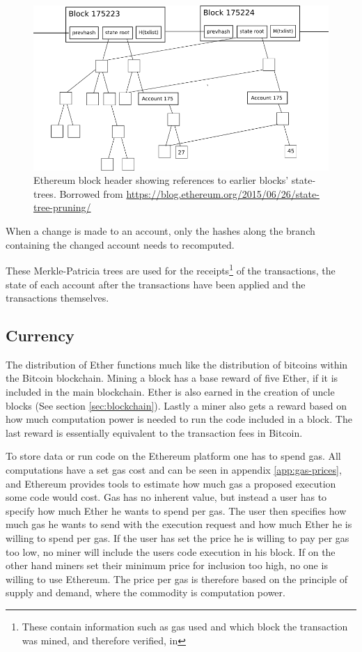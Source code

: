 \documentclass{article}
\begin{document}
			\begin{figure}[!ht]
				\centering
				\includegraphics[scale=0.4]{figures/merkle-backref.png}
			 	\caption[Ethereum block header showing references to earlier blocks]
			 	{Ethereum block header showing references to earlier blocks' state-trees. Borrowed from \url{https://blog.ethereum.org/2015/06/26/state-tree-pruning/}}
			 	\label{fig:merkle-patricia-tree-references}
			\end{figure}

			When a change is made to an account, only the hashes along the branch containing the changed account needs to recomputed.

			These Merkle-Patricia trees are used for the receipts\footnote{These contain information such as gas used and which block the transaction was mined, and therefore verified, in} of the transactions, the state of each account after the transactions have been applied and the transactions themselves.

		\subsection{Currency}
		The distribution of Ether functions much like the distribution of bitcoins within the Bitcoin blockchain. 
		Mining a block has a base reward of five Ether, if it is included in the main blockchain.
		Ether is also earned in the creation of uncle blocks (See section \ref{sec:blockchain}).
		Lastly a miner also gets a reward based on how much computation power is needed to run the code included in a block. 
		The last reward is essentially equivalent to the transaction fees in Bitcoin.

		To store data or run code on the Ethereum platform one has to spend gas. 
		All computations have a set gas cost and can be seen in appendix \ref{app:gas-prices}, and Ethereum provides tools to estimate how much gas a proposed execution some code would cost.
		Gas has no inherent value, but instead a user has to specify how much Ether he wants to spend per gas. 
		The user then specifies how much gas he wants to send with the execution request and how much Ether he is willing to spend per gas. If the user has set the price he is willing to pay per gas too low, no miner will include the users code execution in his block.
		If on the other hand miners set their minimum price for inclusion too high, no one is willing to use Ethereum. 
		The price per gas is therefore based on the principle of supply and demand, where the commodity is computation power.
\end{document}

